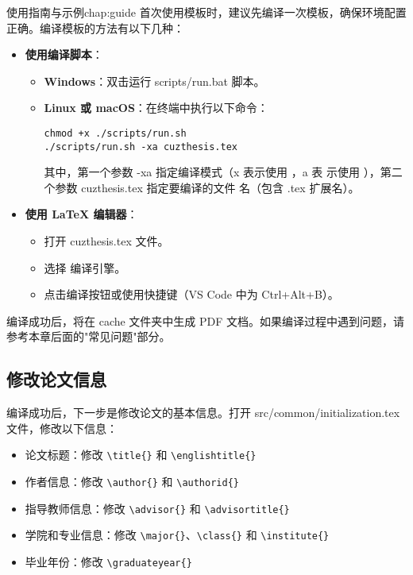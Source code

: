 \begin{cuzchapter}{使用指南与示例}{chap:guide}
    首次使用模板时，建议先编译一次模板，确保环境配置正确。编译模板的方法有以下几种：

    \begin{itemize}
        \item \textbf{使用编译脚本}：
        \begin{itemize}
            \item \textbf{Windows}：双击运行 scripts/run.bat 脚本。
            \item \textbf{Linux 或 macOS}：在终端中执行以下命令：
            \begin{verbatim}
chmod +x ./scripts/run.sh
./scripts/run.sh -xa cuzthesis.tex
            \end{verbatim}
            其中，第一个参数 -xa 指定编译模式（x 表示使用 ，a 表
            示使用 ），第二个参数 cuzthesis.tex 指定要编译的文件
            名（包含 .tex 扩展名）。
        \end{itemize}

        \item \textbf{使用 \LaTeX{} 编辑器}：
        \begin{itemize}
            \item 打开 cuzthesis.tex 文件。
            \item 选择  编译引擎。
            \item 点击编译按钮或使用快捷键（VS Code 中为 Ctrl+Alt+B）。
        \end{itemize}
    \end{itemize}

    编译成功后，将在 cache 文件夹中生成 PDF 文档。如果编译过程中遇到问题，请参考本章后面的"常见问题"部分。

    \subsection{修改论文信息}

    编译成功后，下一步是修改论文的基本信息。打开 src/common/initialization.tex 文件，修改以下信息：

    \begin{itemize}
        \item 论文标题：修改 \verb|\title{}| 和 \verb|\englishtitle{}|
        \item 作者信息：修改 \verb|\author{}| 和 \verb|\authorid{}|
        \item 指导教师信息：修改 \verb|\advisor{}| 和 \verb|\advisortitle{}|
        \item 学院和专业信息：修改 \verb|\major{}|、\verb|\class{}| 和 \verb|\institute{}|
        \item 毕业年份：修改 \verb|\graduateyear{}|
    \end{itemize}


\end{cuzchapter}
